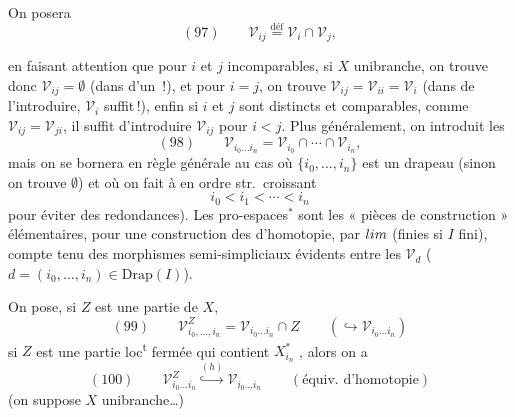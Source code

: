 \documentclass[11pt,a4paper]{article}
\begin{document}
On posera
\[
(97)\qquad \mathcal V_{ij}\overset{\text{déf}}{=}\mathcal V_i\cap\mathcal V_j,
\]


en faisant attention que pour $i$ et $j$ incomparables, si $X$ unibranche, on trouve \struck{\ill{}} donc $\mathcal V_{ij}=\emptyset$ \ill{} (dans   d'un \,!), et pour $i=j$, on trouve $\mathcal V_{ij}=\mathcal V_{ii}=\mathcal V_i$ (dans   de l'introduire, $\mathcal V_i$ suffit\,!), enfin \struck{\ill{}} si $i$ et $j$ sont distincts et comparables, \struck{\ill{}} comme $\mathcal V_{ij}=\mathcal V_{ji}$, il suffit d'introduire $\mathcal V_{ij}$ pour \struck{\ill{}} $i<j$. Plus généralement, on introduit les
\[
(98)\qquad \mathcal V_{i_0\ldots i_n}=\mathcal V_{i_0}\cap\cdots\cap\mathcal V_{i_n},
\]
mais on se bornera en règle générale au cas où $\lbrace i_0,\ldots,i_n\rbrace$ est un drapeau (sinon on trouve $\emptyset$) et où on fait  à  en ordre str.\ croissant
\[
i_0<i_1<\cdots<i_n
\]
pour éviter des redondances). Les pro-espaces${}^{*}$ sont les « pièces de construction » élémentaires, pour une construction des  d'homotopie, par $\varinjlim$ (finies si $I$ fini), compte tenu des morphismes semi-simpliciaux évidents entre les $\mathcal V_d$ ($d=(i_0,\ldots,i_n)\in\mathrm{Drap}(I)$).



On pose, si $Z$ est une partie de $X$,
\[
(99)\qquad \mathcal V^Z_{i_0,\ldots,i_n}=\mathcal V_{i_0\ldots i_n}\cap Z\qquad(\hookrightarrow\mathcal V_{i_0\ldots i_n})
\]
si $Z$ est  une partie loc\textsuperscript{t} fermée qui contient \struck{\ill{}} $X^{*}_{i_n}$  , alors on a
\[
(100)\qquad \mathcal V^Z_{i_0\ldots i_n}\overset{(h)}{\hookrightarrow}\mathcal V_{i_0\ldots i_n}\qquad(\text{équiv.\ d'homotopie})
\]
(on suppose $X$ unibranche\ldots)
\end{document}
